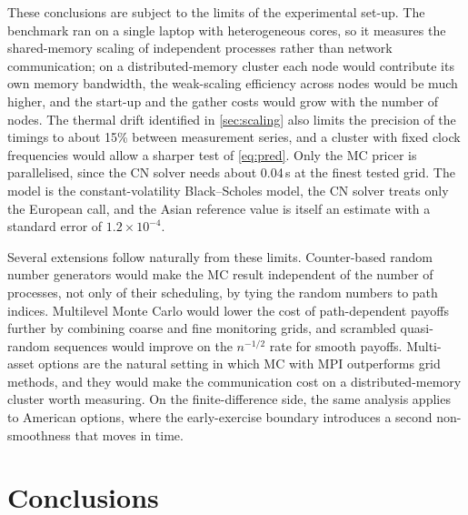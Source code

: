 \documentclass[11pt,a4paper]{article}
\begin{document}
These conclusions are subject to the limits of the experimental set-up.
The benchmark ran on a single laptop with heterogeneous cores, so it measures the shared-memory scaling of independent processes rather than network communication; on a distributed-memory cluster each node would contribute its own memory bandwidth, the weak-scaling efficiency across nodes would be much higher, and the start-up and the gather costs would grow with the number of nodes.
The thermal drift identified in \cref{sec:scaling} also limits the precision of the timings to about 15\% between measurement series, and a cluster with fixed clock frequencies would allow a sharper test of \cref{eq:pred}.
Only the MC pricer is parallelised, since the CN solver needs about 0.04\,s at the finest tested grid.
The model is the constant-volatility Black--Scholes model, the CN solver treats only the European call, and the Asian reference value is itself an estimate with a standard error of $1.2\times10^{-4}$.

Several extensions follow naturally from these limits.
Counter-based random number generators \citep{salmon2011} would make the MC result independent of the number of processes, not only of their scheduling, by tying the random numbers to path indices.
Multilevel Monte Carlo \citep{giles2008} would lower the cost of path-dependent payoffs further by combining coarse and fine monitoring grids, and scrambled quasi-random sequences would improve on the $n^{-1/2}$ rate for smooth payoffs.
Multi-asset options are the natural setting in which MC with MPI outperforms grid methods, and they would make the communication cost on a distributed-memory cluster worth measuring.
On the finite-difference side, the same analysis applies to American options, where the early-exercise boundary introduces a second non-smoothness that moves in time.

\section{Conclusions}\label{sec:conclusions}
\end{document}
